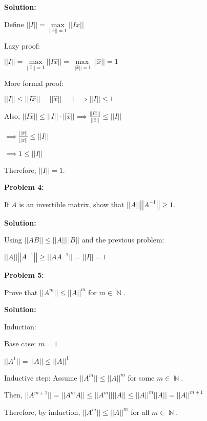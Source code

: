 \documentclass[12pt]{article}
\DeclareMathOperator{\NN}{\mathbb{N}}
\newenvironment{problem}[1]{
    \textbf{Problem #1:}
}{
    \rmfamily \vspace{1em}
}
\newenvironment{solution}{
    \textbf{Solution:}
    
}{
    
    \vspace{2em}
}
\begin{document}
\begin{solution}
    Define \(||I|| = \underset{||\hat{x}|| = 1}{\max} ||I\hat{x}||\)

    Lazy proof:

    \(||I|| = \underset{||\hat{x}|| = 1}{\max} ||I\hat{x}|| = \underset{||\hat{x}|| = 1}{\max} ||\hat{x}|| = 1\)

    More formal proof:
    
    \(||I|| \leq ||I\hat{x}|| = ||\hat{x}|| = 1 \implies ||I||\leq 1\)

    Also, \(||I\hat{x}|| \leq ||I||\cdot||\hat{x}|| \implies \frac{||I\hat{x}||}{||\hat{x}||} \leq ||I||\)

    \(\implies \frac{||\hat{x}||}{||\hat{x}||} \leq ||I||\)

    \(\implies 1 \leq ||I||\)

    Therefore, \(||I|| = 1\).
\end{solution}

\newpage

\begin{problem}{4}
    If \(A\) is an invertible matrix, show that \(||A|| \left|\left|A^{-1}\right|\right| \geq 1\).
\end{problem}

\begin{solution}
    Using \(||AB|| \leq ||A|| \left|\left|B\right|\right|\) and the previous problem:

    \(||A|| \left|\left|A^{-1}\right|\right| \geq ||A A^{-1}|| = ||I|| = 1\)
\end{solution}

\newpage

\begin{problem}{5}
    Prove that \(||A^m|| \leq ||A||^m\) for \(m \in \NN\).
\end{problem}

\begin{solution}
    Induction:

    Base case: \(m = 1\)

    \(||A^1|| = ||A|| \leq ||A||^1\)

    Inductive step: Assume \(||A^m|| \leq ||A||^m\) for some \(m \in \NN\).

    Then, \(||A^{m+1}|| = ||A^m A|| \leq ||A^m|| ||A|| \leq ||A||^m ||A|| = ||A||^{m+1}\)

    Therefore, by induction, \(||A^m|| \leq ||A||^m\) for all \(m \in \NN\).
\end{solution}
\end{document}
